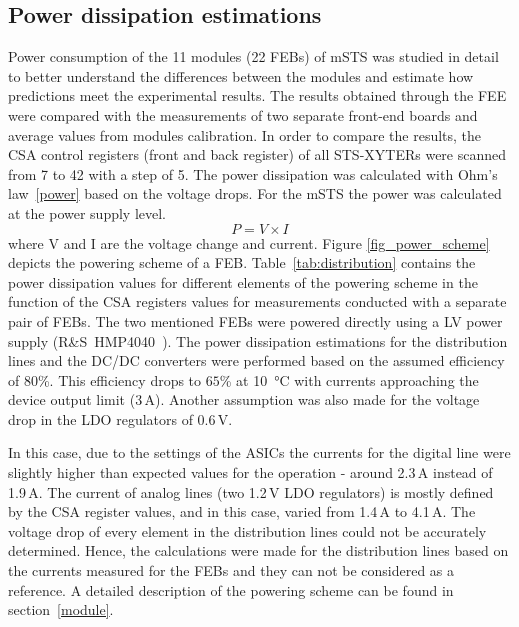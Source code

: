 \subsection{Power dissipation estimations}
 Power consumption of the 11 modules (22 \glspl{FEB}) of \gls{mSTS} was studied in detail to better understand the differences between the modules and estimate how predictions meet the experimental results. The results obtained through the \gls{FEE} were compared with the measurements of two separate front-end boards and average values from modules calibration. In order to compare the results, the \gls{CSA} control registers (front and back register) of all STS-XYTERs were scanned from 7 to 42 with a step of 5. The power dissipation was calculated with Ohm's law~\ref{power} based on the voltage drops. For the \gls{mSTS} the power was calculated at the power supply level.
  \begin{equation}
  \label{power}
    P = V\times I
\end{equation}
where V and I are the voltage change and current. Figure \ref{fig_power_scheme} depicts the powering scheme of a \gls{FEB}. Table~\ref{tab:distribution} contains the power dissipation values for different elements of the powering scheme in the function of the \gls{CSA} registers values for measurements conducted with a separate pair of \glspl{FEB}. The two mentioned \glspl{FEB} were powered directly using a \gls{LV} power supply (R\&S~HMP4040~\cite{RS}). The power dissipation estimations for the distribution lines and the DC/DC converters were performed based on the assumed efficiency of $80$\%. This efficiency drops to $65$\% at \SI{10}{\celsius} with currents approaching the device output limit (3\,A).  Another assumption was also made for the voltage drop in the \gls{LDO} regulators of 0.6\,V. 
 
 In this case, due to the settings of the \glspl{ASIC} the currents for the digital line were slightly higher than expected values for the operation - around 2.3\,A instead of 1.9\,A. The current of analog lines (two 1.2\,V LDO regulators) is mostly defined by the \gls{CSA} register values, and in this case, varied from 1.4\,A to 4.1\,A.  The voltage drop of every element in the distribution lines could not be accurately determined. Hence, the calculations were made for the distribution lines based on the currents measured for the \glspl{FEB} and they can not be considered as a reference. A detailed description of the powering scheme can be found in section~\ref{module}.


